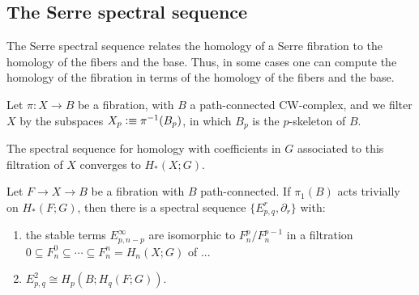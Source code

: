 \documentclass{article}
\begin{document}
\subsection{The Serre spectral sequence}

The Serre spectral sequence relates the homology of a Serre fibration to the
homology of the fibers and the base. Thus, in some cases one can compute the
homology of the fibration in terms of the homology of the fibers and the base.

Let $\pi : X\to B$ be a fibration, with $B$ a path-connected CW-complex, and we
filter $X$ by the subspaces $X_p\vcentcolon\equiv \pi^{-1}(B_p)$, in which $B_p$ is the
$p$-skeleton of $B$. 

\begin{lem}
The spectral sequence for homology with coefficients in $G$ associated to this
filtration of $X$ converges to $H_\ast(X;G)$.
\end{lem}

\begin{thm}
Let $F\to X\to B$ be a fibration with $B$ path-connected. If $\pi_1(B)$ acts
trivially on $H_\ast(F;G)$, then there is a spectral sequence $\{E^r_{p,q},\partial_r\}$
with:
\begin{enumerate}
\item the stable terms $E^\infty_{p,n-p}$ are isomorphic to $F^p_n/F^{p-1}_n$ in
a filtration $0\subseteq F^0_n\subseteq\cdots\subseteq F^n_n=H_n(X;G)$ of ...
\item $E^2_{p,q}\cong H_p(B;H_q(F;G))$. 
\end{enumerate}
\end{thm}
\end{document}

